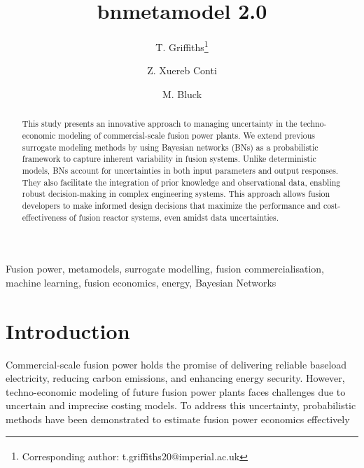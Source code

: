 \documentclass[journal]{IEEEtran}
\begin{document}
\title{bnmetamodel 2.0}

\author[1]{T. Griffiths\thanks{\textsuperscript{\Cross}Corresponding author: t.griffiths20@imperial.ac.uk}}
\author[2]{Z. Xuereb Conti}
\author[1]{M. Bluck}

\vspace{-15pt}

\maketitle

\begin{abstract}
This study presents an innovative approach to managing uncertainty in the techno-economic modeling of commercial-scale fusion power plants. We extend previous surrogate modeling methods by using Bayesian networks (BNs) as a probabilistic framework to capture inherent variability in fusion systems. Unlike deterministic models, BNs account for uncertainties in both input parameters and output responses. They also facilitate the integration of prior knowledge and observational data, enabling robust decision-making in complex engineering systems. This approach allows fusion developers to make informed design decisions that maximize the performance and cost-effectiveness of fusion reactor systems, even amidst data uncertainties.
\end{abstract}

\begin{IEEEkeywords}
Fusion power, metamodels, surrogate modelling, fusion commercialisation, machine learning, fusion economics, energy, Bayesian Networks
\end{IEEEkeywords}
\vspace{-2ex}

\section{Introduction}

Commercial-scale fusion power holds the promise of delivering reliable baseload electricity, reducing carbon emissions, and enhancing energy security. However, techno-economic modeling of future fusion power plants faces challenges due to uncertain and imprecise costing models. To address this uncertainty, probabilistic methods have been demonstrated to estimate fusion power economics effectively~\cite{Griffiths2024}
\end{document}
